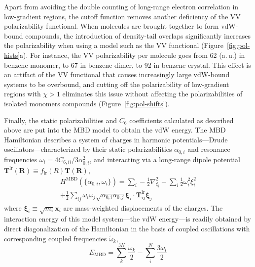 Apart from avoiding the double counting of long-range electron correlation in low-gradient regions, the cutoff function removes another deficiency of the VV polarizability functional.
When molecules are brought together to form vdW-bound compounds, the introduction of density-tail overlaps significantly increases the polarizability when using a model such as the VV functional (Figure~\ref{fig:pol-hists}a).
For instance, the VV polarizability per molecule goes from 62 (a.\,u.) in benzene monomer, to 67 in benzene dimer, to 92 in benzene crystal.
This effect is an artifact of the VV functional that causes increasingly large vdW-bound systems to be overbound, and cutting off the polarizability of low-gradient regions with $\chi>1$ eliminates this issue without
affecting the polarizabilities of isolated monomers compounds (Figure~\ref{fig:pol-shifts}).


Finally, the static polarizabilities and $C_6$ coefficients calculated as described above are put into the MBD model to obtain the vdW energy.
The MBD Hamiltonian describes a system of charges in harmonic potentials---Drude oscillators---characterized by their static polarizabilities $\alpha_{0,i}$ and resonance frequencies $\omega_i=4C_{6,ii}/3\alpha_{0,i}^2$, and interacting via a long-range dipole potential $\mathbf T^\mathrm{lr}(\mathbf R)\equiv f_\text{lr}(R)\mathbf T(\mathbf R)$,
\begin{multline}
  H^\text{MBD}(\{\alpha_{0,i},\omega_i\})
  =\sum_i-\frac12\nabla_{\xi_i}^2+\sum_i\frac12\omega_i^2\xi_i^2 \\
  +\frac12\sum_{ij}\omega_i\omega_j\sqrt{\alpha_{0,i}\alpha_{0,j}}\boldsymbol{\xi}_i\cdot\mathbf T^\mathrm{lr}_{ij}\boldsymbol{\xi}_j
\end{multline}
where $\boldsymbol\xi_i\equiv\sqrt{m_i}\mathbf x_i$ are mass-weighted displacements of the charges.
The interaction energy of this model system---the vdW energy---is readily obtained by direct diagonalization of the Hamiltonian in the basis of coupled oscillations with corresponding coupled frequencies $\tilde\omega_k$,
\begin{equation}
  E_\text{MBD}=\sum_k^{3N}\frac{\tilde\omega_k}2-\sum_i^N\frac{3\omega_i}2
\end{equation}

